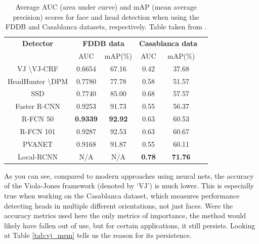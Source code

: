 \documentclass[11pt,a4paper,oldfontcommands]{memoir}
\begin{document}
\begin{table}[]
\centering
    \begin{tabular}{|c||c|c||c|c||c|} 
        \hline
        \textbf{Detector} & \multicolumn{2}{c||}{\textbf{FDDB data}} & \multicolumn{2}{c||}{\textbf{Casablanca data}} \\ 
         & AUC & mAP(\%) & AUC & mAP(\%) \\
        \hline\hline
        VJ \cite{viola} \textbackslash \space VJ-CRF \cite{VJ_CRF} & 0.6654 & 67.16 & 0.42 & 37.68 \\ 
        \hline
        HeadHunter \cite{HeadHunter} \textbackslash \space DPM \cite{DPM} & 0.7780 & 77.78 & 0.58 & 51.57 \\
        \hline
        \hline
        SSD \cite{SDD} & 0.7740 & 85.00 & 0.68 & 57.57 \\
        \hline
        Faster R-CNN \cite{FRCNN} & 0.9253 & 91.73 & 0.55 & 56.37 \\
        \hline
        R-FCN 50 \cite{RFCN} & \textbf{0.9339} & \textbf{92.92} & 0.63 & 60.53 \\
        \hline
        R-FCN 101 \cite{RFCN} & 0.9287 & 92.53 & 0.63 & 60.67 \\
        \hline
        PVANET \cite{RFCN} & 0.9168 & 91.87 & 0.55 & 60.11 \\
        \hline
        Local-RCNN \cite{LRCNN} & N/A & N/A & \textbf{0.78} & \textbf{71.76} \\ 
        \hline  
    \end{tabular}
\caption{Average AUC (area under curve) and mAP (mean average precision) scores for face and head detection when using the FDDB \cite{ds:FDDB_Dataset} and Casablanca \cite{ds:Casablanca_Dataset} datasets, respectively. Table taken from \cite{Face_detection_Comparison}.}
\label{tab:vj_acc}
\end{table}

As you can see, compared to modern approaches using neural nets, the accuracy of the Viola-Jones framework (denoted by `VJ') is much lower. This is especially true when working on the Casablanca dataset, which measures performance detecting heads in multiple different orientations, not just faces. Were the accuracy metrics used here the only metrics of importance, the method would likely have fallen out of use, but for certain applications, it still persists. Looking at Table \ref{tab:vj_mem} tells us the reason for its persistence. 
\end{document}

